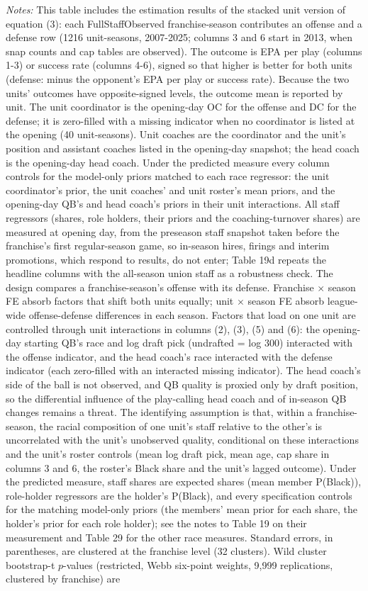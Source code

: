 {\footnotesize
\noindent\textit{Notes:} This table includes the estimation results of the stacked unit version of equation (3): each FullStaffObserved franchise-season contributes an offense and a defense row (1216 unit-seasons, 2007-2025; columns 3 and 6 start in 2013, when snap counts and cap tables are observed). The outcome is EPA per play (columns 1-3) or success rate (columns 4-6), signed so that higher is better for both units (defense: minus the opponent's EPA per play or success rate). Because the two units' outcomes have opposite-signed levels, the outcome mean is reported by unit. The unit coordinator is the opening-day OC for the offense and DC for the defense; it is zero-filled with a missing indicator when no coordinator is listed at the opening (40 unit-seasons). Unit coaches are the coordinator and the unit's position and assistant coaches listed in the opening-day snapshot; the head coach is the opening-day head coach. Under the predicted measure every column controls for the model-only priors matched to each race regressor: the unit coordinator's prior, the unit coaches' and unit roster's mean priors, and the opening-day QB's and head coach's priors in their unit interactions. All staff regressors (shares, role holders, their priors and the coaching-turnover shares) are measured at opening day, from the preseason staff snapshot taken before the franchise's first regular-season game, so in-season hires, firings and interim promotions, which respond to results, do not enter; Table 19d repeats the headline columns with the all-season union staff as a robustness check. The design compares a franchise-season's offense with its defense. Franchise $\times$ season FE absorb factors that shift both units equally; unit $\times$ season FE absorb league-wide offense-defense differences in each season. Factors that load on one unit are controlled through unit interactions in columns (2), (3), (5) and (6): the opening-day starting QB's race and log draft pick (undrafted = log 300) interacted with the offense indicator, and the head coach's race interacted with the defense indicator (each zero-filled with an interacted missing indicator). The head coach's side of the ball is not observed, and QB quality is proxied only by draft position, so the differential influence of the play-calling head coach and of in-season QB changes remains a threat. The identifying assumption is that, within a franchise-season, the racial composition of one unit's staff relative to the other's is uncorrelated with the unit's unobserved quality, conditional on these interactions and the unit's roster controls (mean log draft pick, mean age, cap share in columns 3 and 6, the roster's Black share and the unit's lagged outcome). Under the predicted measure, staff shares are expected shares (mean member P(Black)), role-holder regressors are the holder's P(Black), and every specification controls for the matching model-only priors (the members' mean prior for each share, the holder's prior for each role holder); see the notes to Table 19 on their measurement and Table 29 for the other race measures. Standard errors, in parentheses, are clustered at the franchise level (32 clusters). Wild cluster bootstrap-t $p$-values (restricted, Webb six-point weights, 9,999 replications, clustered by franchise) are }
